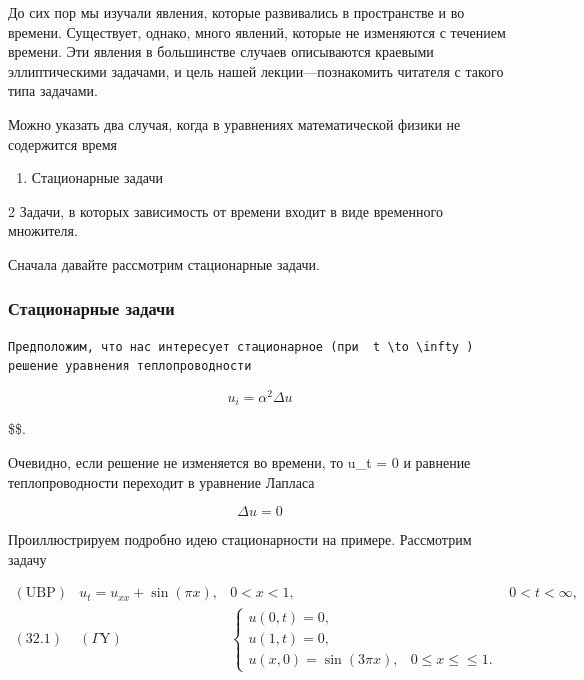 \documentclass[
  ukrainian,
]{article}
\providecommand{\tightlist}{%
  \setlength{\itemsep}{0pt}\setlength{\parskip}{0pt}}
\begin{document}
До сих пор мы изучали явления, которые развивались в пространстве и во
времени. Существует, однако, много явлений, которые не изменяются с
течением времени. Эти явления в большинстве случаев описываются краевыми
эллиптическими задачами, и цель нашей лекции---познакомить читателя с
такого типа задачами.

Можно указать два случая, когда в уравнениях математической физики не
содержится время

\begin{enumerate}
\def\labelenumi{\arabic{enumi}.}
\tightlist
\item
  Стационарные задачи
\end{enumerate}

2 Задачи, в которых зависимость от времени входит в виде временного
множителя.

Сначала давайте рассмотрим стационарные задачи.

\subsubsection{Стационарные
задачи}\label{ux441ux442ux430ux446ux438ux43eux43dux430ux440ux43dux44bux435-ux437ux430ux434ux430ux447ux438}

\begin{verbatim}
Предположим, что нас интересует стационарное (при  t \to \infty ) решение уравнения теплопроводности
\end{verbatim}

\[
u_i = \alpha^2 \Delta u
\]

\$\$.

Очевидно, если решение не изменяется во времени, то u\_t = 0 и равнение
теплопроводности переходит в уравнение Лапласа

\[
\Delta u = 0
\]

Проиллюстрируем подробно идею стационарности на примере. Рассмотрим
задачу

\[
\begin{array}{ll} (\text{UBP}) & u_t = u_{xx} + \sin{(\pi x)}, & 0 < x < 1, & 0 < t < \infty, \\ (32.1) & (\Gamma \text{Y}) & \begin{cases} u(0, t) = 0, \\ u(1, t) = 0, \\ u(x, 0) = \sin{(3\pi x)}, & 0 \le x \le \le 1. \end{cases} \\ \end{array}
\]
\end{document}
